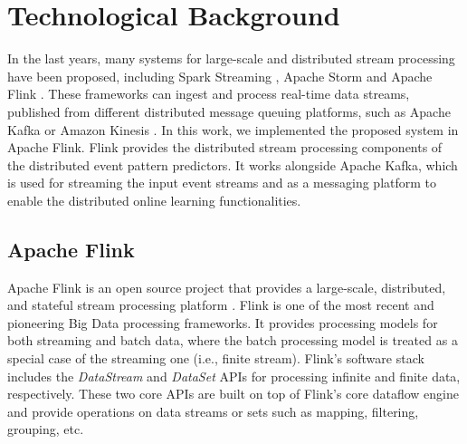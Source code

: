 \section{Technological Background}
\par In the last years, many systems for large-scale and distributed stream processing have been proposed, including Spark Streaming \cite{Spark},  Apache Storm \cite{Storm} and Apache Flink \cite{Flink}. These frameworks can ingest and process real-time data streams, published from different distributed message queuing platforms, such as Apache Kafka \cite{Kafka} or  Amazon Kinesis \cite{Kinesis}. In this work, we implemented the proposed system in Apache Flink. Flink provides the distributed stream processing components of the distributed event pattern predictors. It works alongside Apache Kafka,
which is used for streaming the input event streams and as a messaging platform to enable the distributed online learning functionalities.





\subsection{Apache Flink}

\par Apache Flink is an open source project that provides a large-scale, distributed, and stateful stream processing platform \cite{carbone2015apache}. Flink is one of the most recent and pioneering Big Data processing frameworks. It provides processing models for both streaming and batch data, where the batch processing model is treated as a special case of the streaming one (i.e., finite stream). Flink's software stack includes the \textit{DataStream} and \textit{DataSet} APIs for processing infinite and finite data, respectively. These two core APIs are built on top of Flink's core dataflow engine and provide operations on data streams or sets such as mapping, filtering, grouping, etc.

